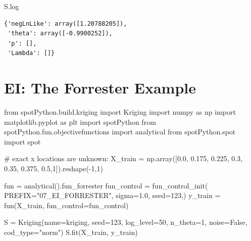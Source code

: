 \documentclass[
  letterpaper,
  DIV=11,
  numbers=noendperiod]{scrreprt}
\newenvironment{Shaded}{\begin{snugshade}}{\end{snugshade}}
\newcommand{\CommentTok}[1]{\textcolor[rgb]{0.37,0.37,0.37}{#1}}
\newcommand{\DecValTok}[1]{\textcolor[rgb]{0.68,0.00,0.00}{#1}}
\newcommand{\FloatTok}[1]{\textcolor[rgb]{0.68,0.00,0.00}{#1}}
\newcommand{\ImportTok}[1]{\textcolor[rgb]{0.00,0.46,0.62}{#1}}
\newcommand{\NormalTok}[1]{\textcolor[rgb]{0.00,0.23,0.31}{#1}}
\newcommand{\OperatorTok}[1]{\textcolor[rgb]{0.37,0.37,0.37}{#1}}
\newcommand{\StringTok}[1]{\textcolor[rgb]{0.13,0.47,0.30}{#1}}
\newcommand{\VariableTok}[1]{\textcolor[rgb]{0.07,0.07,0.07}{#1}}
\begin{document}
\begin{Shaded}
\begin{Highlighting}[]
\NormalTok{S.log}
\end{Highlighting}
\end{Shaded}

\begin{verbatim}
{'negLnLike': array([1.20788205]),
 'theta': array([-0.9900252]),
 'p': [],
 'Lambda': []}
\end{verbatim}

\section{EI: The Forrester Example}\label{ei-the-forrester-example}

\begin{Shaded}
\begin{Highlighting}[]
\ImportTok{from}\NormalTok{ spotPython.build.kriging }\ImportTok{import}\NormalTok{ Kriging}
\ImportTok{import}\NormalTok{ numpy }\ImportTok{as}\NormalTok{ np}
\ImportTok{import}\NormalTok{ matplotlib.pyplot }\ImportTok{as}\NormalTok{ plt}
\ImportTok{import}\NormalTok{ spotPython}
\ImportTok{from}\NormalTok{ spotPython.fun.objectivefunctions }\ImportTok{import}\NormalTok{ analytical}
\ImportTok{from}\NormalTok{ spotPython.spot }\ImportTok{import}\NormalTok{ spot}

\CommentTok{\# exact x locations are unknown:}
\NormalTok{X\_train }\OperatorTok{=}\NormalTok{ np.array([}\FloatTok{0.0}\NormalTok{, }\FloatTok{0.175}\NormalTok{, }\FloatTok{0.225}\NormalTok{, }\FloatTok{0.3}\NormalTok{, }\FloatTok{0.35}\NormalTok{, }\FloatTok{0.375}\NormalTok{, }\FloatTok{0.5}\NormalTok{,}\DecValTok{1}\NormalTok{]).reshape(}\OperatorTok{{-}}\DecValTok{1}\NormalTok{,}\DecValTok{1}\NormalTok{)}

\NormalTok{fun }\OperatorTok{=}\NormalTok{ analytical().fun\_forrester}
\NormalTok{fun\_control }\OperatorTok{=}\NormalTok{ fun\_control\_init(}
\NormalTok{    PREFIX}\OperatorTok{=}\StringTok{"07\_EI\_FORRESTER"}\NormalTok{,}
\NormalTok{    sigma}\OperatorTok{=}\FloatTok{1.0}\NormalTok{,}
\NormalTok{    seed}\OperatorTok{=}\DecValTok{123}\NormalTok{,)}
\NormalTok{y\_train }\OperatorTok{=}\NormalTok{ fun(X\_train, fun\_control}\OperatorTok{=}\NormalTok{fun\_control)}

\NormalTok{S }\OperatorTok{=}\NormalTok{ Kriging(name}\OperatorTok{=}\StringTok{\textquotesingle{}kriging\textquotesingle{}}\NormalTok{,  seed}\OperatorTok{=}\DecValTok{123}\NormalTok{, log\_level}\OperatorTok{=}\DecValTok{50}\NormalTok{, n\_theta}\OperatorTok{=}\DecValTok{1}\NormalTok{, noise}\OperatorTok{=}\VariableTok{False}\NormalTok{, cod\_type}\OperatorTok{=}\StringTok{"norm"}\NormalTok{)}
\NormalTok{S.fit(X\_train, y\_train)}


\end{Highlighting}
\end{Shaded}
\end{document}
